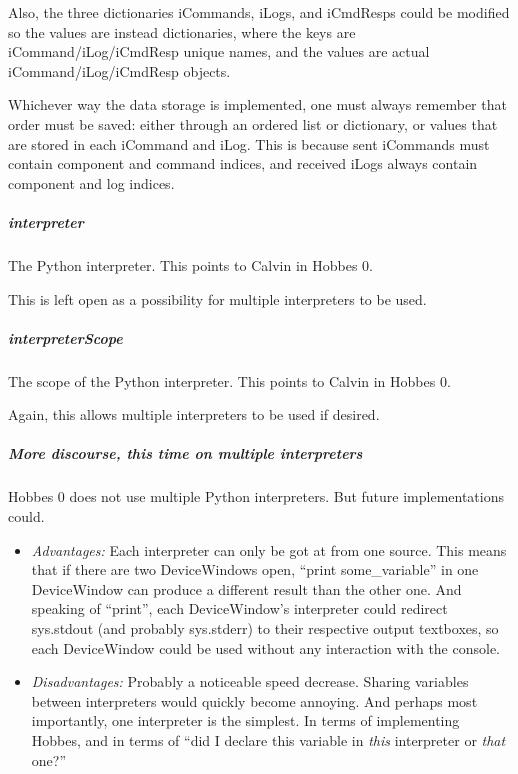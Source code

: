 \documentclass[12pt,letterpaper]{article}
\begin{document}
Also, the three dictionaries iCommands, iLogs, and iCmdResps could be modified so the values are instead dictionaries, where the keys are iCommand/iLog/iCmdResp unique names, and the values are actual iCommand/iLog/iCmdResp objects.

Whichever way the data storage is implemented, one must always remember that order must be saved: either through an ordered list or dictionary, or values that are stored in each iCommand and iLog. This is because sent iCommands must contain component and command indices, and received iLogs always contain component and log indices.



%
%
\subparagraph{interpreter}
\label{4.3.2.2.6}

The Python interpreter. This points to Calvin in Hobbes 0.

This is left open as a possibility for multiple interpreters to be used.



%
%
\subparagraph{interpreterScope}
\label{4.3.2.2.7}

The scope of the Python interpreter. This points to Calvin in Hobbes 0.

Again, this allows multiple interpreters to be used if desired.



%
%
\subparagraph{More discourse, this time on multiple interpreters}
\label{4.3.2.2.8}

Hobbes 0 does not use multiple Python interpreters. But future implementations could.

\begin{itemize}

\item \emph{Advantages:} Each interpreter can only be got at from one source. This means that if there are two DeviceWindows open, ``print some\_variable'' in one DeviceWindow can produce a different result than the other one. And speaking of ``print'', each DeviceWindow's interpreter could redirect sys.stdout (and probably sys.stderr) to their respective output textboxes, so each DeviceWindow could be used without any interaction with the console.

\item \emph{Disadvantages:} Probably a noticeable speed decrease. Sharing variables between interpreters would quickly become annoying. And perhaps most importantly, one interpreter is the simplest. In terms of implementing Hobbes, and in terms of ``did I declare this variable in \emph{this} interpreter or \emph{that} one?''

\end{itemize}
\end{document}
